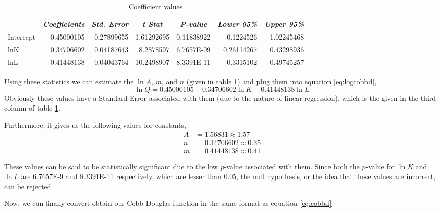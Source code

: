 \documentclass[a4paper,12pt]{article}
\theoremstyle{definition}
\begin{document}
\begin{table}[H]
  \centering
  \caption{Coefficient values}
    \begin{tabular}{lrrrrrr}
    \toprule
          & \multicolumn{1}{c}{\textit{Coefficients}} & \multicolumn{1}{c}{\textit{Std. Error}} & \multicolumn{1}{c}{\textit{t Stat}} & \multicolumn{1}{c}{\textit{P-value}} & \multicolumn{1}{c}{\textit{Lower 95\%}} & \multicolumn{1}{c}{\textit{Upper 95\%}} \\
    \midrule
    Intercept & 0.45000105 & 0.27899655 & 1.61292695 & 0.11838922 & -0.1224526 & 1.02245468  \\
    lnK   & 0.34706602 & 0.04187643 & 8.2878597 & 6.7657E-09 & 0.26114267 & 0.43298936 \\
    lnL   & 0.41448138 & 0.04043764 & 10.2498907 & 8.3391E-11 & 0.3315102 & 0.49745257 \\
    \bottomrule
    \end{tabular}%
  \label{tab:vals}%
\end{table}%

Using these statistics we can estimate the $\ln A$, $m$, and $n$ (given in table \ref{tab:vals}) and plug them into equation \eqref{eq:logcobbd},
\begin{equation}
	\ln Q=0.45000105 +0.34706602 \ln K+ 0.41448138 \ln L
\end{equation}
Obviously these values have a Standard Error associated with them (due to the nature of linear regression), which is the given in the third column of table \ref{tab:vals}.

Furthermore, it gives us the following values for constants,
\begin{equation}
	\begin{split}
		A &= 1.56831 \approx 1.57 \\
		n &= 0.34706602 \approx 0.35 \\
		m &= 0.41448138 \approx 0.41 
	\end{split}
\end{equation}

These values can be said to be statistically significant due to the low $p$-value associated with them. Since both the $p$-value for $\ln K$ and $\ln L$ are 6.7657E-9 and 8.3391E-11 respectively, which are lesser than 0.05, the null hypothesis, or the idea that these values are incorrect, can be rejected.

Now, we can finally convert obtain our Cobb-Douglas function in the same format as equation \eqref{eq:cobbd}
\end{document}
